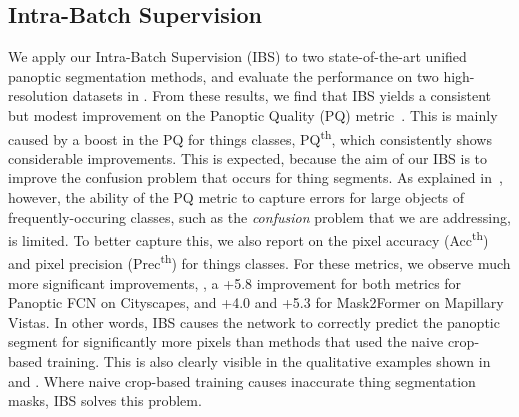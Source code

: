 \documentclass[10pt,twocolumn,letterpaper]{article}
\begin{document}
\subsection{Intra-Batch Supervision}
We apply our Intra-Batch Supervision (IBS) to two state-of-the-art unified panoptic segmentation methods, and evaluate the performance on two high-resolution datasets in . From these results, we find that IBS yields a consistent but modest improvement on the Panoptic Quality (PQ) metric~\cite{kirillov2019ps}. This is mainly caused by a boost in the PQ for things classes, PQ\textsuperscript{th}, which consistently shows considerable improvements. This is expected, because the aim of our IBS is to improve the confusion problem that occurs for thing segments. As explained in~, however, the ability of the PQ metric to capture errors for large objects of frequently-occuring classes, such as the \textit{confusion} problem that we are addressing, is limited. To better capture this, we also report on the pixel accuracy (Acc\textsuperscript{th}) and pixel precision (Prec\textsuperscript{th}) for things classes. For these metrics, we observe much more significant improvements, \eg, a +5.8 improvement for both metrics for Panoptic FCN on Cityscapes, and +4.0 and +5.3 for Mask2Former on Mapillary Vistas. In other words, IBS  causes the network to correctly predict the panoptic segment for significantly more pixels than methods that used the naive crop-based training. This is also clearly visible in the qualitative examples shown in~ and . Where naive crop-based training causes inaccurate thing segmentation masks, IBS solves this problem.
\end{document}
